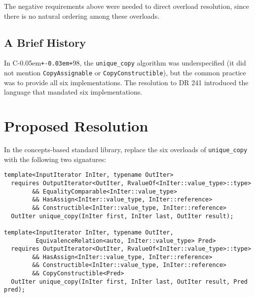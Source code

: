 \documentclass[american]{article}
\newcommand{\added}[1]{\textcolor{addclr}{\ul{#1}}}
\newcommand{\removed}[1]{\textcolor{remclr}{\st{#1}}}
\newcommand{\changed}[2]{\removed{#1}\added{#2}}
\newcommand{\code}[1]{\lstinline[basicstyle=\sffamily,keywords={}]{#1}}
\newcommand{\Cpp}{C\kern-0.05em\texttt{+\kern-0.03em+}}
\newcommand{\tcode}[1]{\code{#1}}
\begin{document}
The negative requirements above were needed to direct overload resolution, since
there is no natural ordering among these overloads.

\subsection{A Brief History}
In \Cpp98, the \tcode{unique_copy} algorithm was underspecified (it
did not mention \tcode{CopyAssignable} or \tcode{CopyConstructible}),
but the common practice was to provide all six implementations. The
resolution to DR 241 introduced the language that mandated six
implementations. 

\section{Proposed Resolution}
In the concepts-based standard library, replace the six overloads of
\tcode{unique_copy} with the following two signatures:

\begin{lstlisting}
template<InputIterator InIter, typename OutIter>
  requires OutputIterator<OutIter, RvalueOf<InIter::value_type>::type>
        && EqualityComparable<InIter::value_type>
        && HasAssign<InIter::value_type, InIter::reference>
        && Constructible<InIter::value_type, InIter::reference>
  OutIter unique_copy(InIter first, InIter last, OutIter result);

template<InputIterator InIter, typename OutIter,
         EquivalenceRelation<auto, InIter::value_type> Pred>
  requires OutputIterator<OutIter, RvalueOf<InIter::value_type>::type>
        && HasAssign<InIter::value_type, InIter::reference>
        && Constructible<InIter::value_type, InIter::reference>
        && CopyConstructible<Pred>
  OutIter unique_copy(InIter first, InIter last, OutIter result, Pred pred);
\end{lstlisting}

\end{document}
